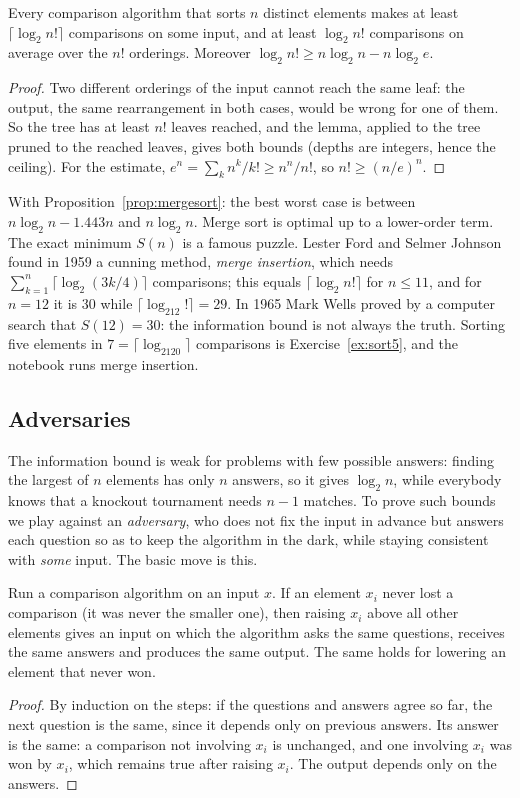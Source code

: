 \begin{theorem}\label{thm:sortlower}
Every comparison algorithm that sorts $n$ distinct elements makes at least $\lceil\log_2n!\rceil$ comparisons on some input, and at least
$\log_2n!$ comparisons on average over the $n!$ orderings. Moreover $\log_2n!\ge n\log_2n-n\log_2e$.
\end{theorem}
\begin{proof}
Two different orderings of the input cannot reach the same leaf: the output, the same rearrangement in both cases, would be wrong for
one of them. So the tree has at least $n!$ leaves reached, and the lemma, applied to the tree pruned to the reached leaves, gives both bounds
(depths are integers, hence the ceiling). For the estimate, $e^n=\sum_k n^k/k!\ge n^n/n!$, so $n!\ge(n/e)^n$.
\end{proof}

With Proposition~\ref{prop:mergesort}: the best worst case is between $n\log_2n-1.443n$ and $n\log_2n$. Merge sort is optimal up to a
lower-order term. The exact minimum $S(n)$ is a famous puzzle. Lester Ford and Selmer Johnson found in 1959 a cunning method, \emph{merge
insertion}, which needs $\sum_{k=1}^n\lceil\log_2(3k/4)\rceil$ comparisons; this equals $\lceil\log_2 n!\rceil$ for $n\le11$, and for $n=12$ it is $30$
while $\lceil\log_212!\rceil=29$. In 1965 Mark Wells proved by a computer search that $S(12)=30$: the information bound is not always the
truth. Sorting five elements in $7=\lceil\log_2120\rceil$ comparisons is Exercise~\ref{ex:sort5}, and the notebook runs merge insertion.

\subsection*{Adversaries}

The information bound is weak for problems with few possible answers: finding the largest of $n$ elements has only $n$ answers, so
it gives $\log_2n$, while everybody knows that a knockout tournament needs $n-1$ matches. To prove such bounds we play against an
\emph{adversary}, who does not fix the input in advance but answers each question so as to keep the algorithm in the dark, while staying
consistent with \emph{some} input. The basic move is this.

\begin{lemma}\label{lem:raise}
Run a comparison algorithm on an input $x$. If an element $x_i$ never lost a comparison (it was never the smaller one), then raising $x_i$ above
all other elements gives an input on which the algorithm asks the same questions, receives the same answers and produces the same output.
The same holds for lowering an element that never won.
\end{lemma}
\begin{proof}
By induction on the steps: if the questions and answers agree so far, the next question is the same, since it depends only on previous
answers. Its answer is the same: a comparison not involving $x_i$ is unchanged, and one involving $x_i$ was won by $x_i$, which remains true
after raising $x_i$. The output depends only on the answers.
\end{proof}

